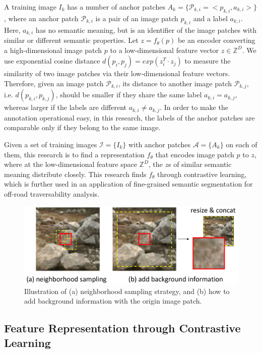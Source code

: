 \documentclass[letterpaper, 10 pt, conference]{ieeeconf}  %
\begin{document}
A training image $I_k$ has a number of anchor patches $A_k=\{\mathcal{P}_{k,i}=<p_{k,i},a_{k,i}>\}$, where an anchor patch $\mathcal{P}_{k,i}$ is a pair of an image patch $p_{k,i}$ and a label $a_{k,i}$. Here, $a_{k,i}$ has no semantic meaning, but is an identifier of the image patches with similar or different semantic properties.
Let $z=f_{\theta}(p)$ be an encoder converting a high-dimensional image patch $p$ to a low-dimensional feature vector $z\in \mathbb{Z}^D$. 
We use exponential cosine distance $d(p_i,p_j)=exp(z_i^T \cdot z_j)$ to measure the similarity of two image patches via their low-dimensional feature vectors.
Therefore, given an image patch $\mathcal{P}_{k,i}$, its distance to another image patch $\mathcal{P}_{k,j}$, i.e. $d(p_{k,i},p_{k,j})$, should be smaller if they share the same label $a_{k,i}=a_{k,j}$, whereas larger if the labels are different $a_{k,i} \neq a_{k,j}$.
In order to make the annotation operational easy, in this research, the labels of the anchor patches are comparable only if they belong to the same image.

Given a set of training images $\mathcal{I}=\{I_k\}$ with anchor patches $\mathcal{A}=\{A_k\}$ on each of them, this research is to find a representation $f_{\theta}$ that encodes image patch $p$ to $z$, where at the low-dimensional feature space $\mathbb{Z}^D$, the $z$s of similar semantic meaning distribute closely. 
This research finds $f_{\theta}$ through contrastive learning, which is further used in an application of fine-grained semantic segmentation for off-road traversability analysis.

\begin{figure}[]
	\centering
	\includegraphics[scale=0.235]{dataaug.pdf}
	\caption{Illustration of (a) neighborhood sampling strategy, and (b) how to add background information with the origin image patch.}
	\label{fig:dataaug}
\end{figure}

\subsection{Feature Representation through Contrastive Learning}
\end{document}
